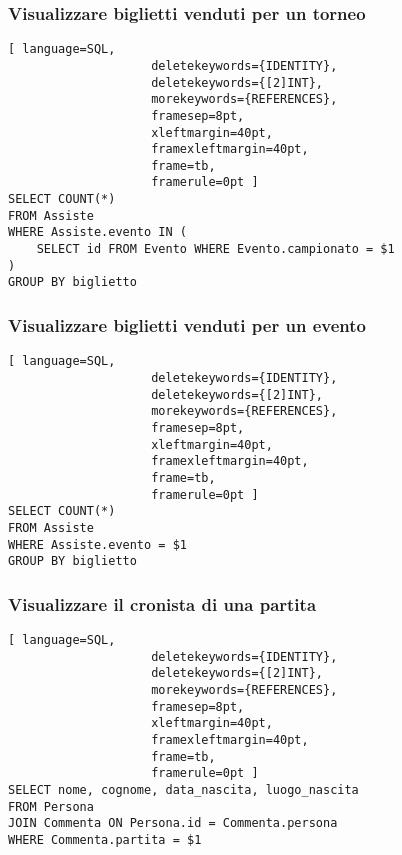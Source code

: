 \documentclass{article}
\begin{document}
\subsubsection{Visualizzare biglietti venduti per un torneo}
\begin{lstlisting}[ language=SQL,
                    deletekeywords={IDENTITY},
                    deletekeywords={[2]INT},
                    morekeywords={REFERENCES},
                    framesep=8pt,
                    xleftmargin=40pt,
                    framexleftmargin=40pt,
                    frame=tb,
                    framerule=0pt ]
SELECT COUNT(*)
FROM Assiste
WHERE Assiste.evento IN (
    SELECT id FROM Evento WHERE Evento.campionato = $1
)
GROUP BY biglietto
\end{lstlisting}

\subsubsection{Visualizzare biglietti venduti per un evento}
\begin{lstlisting}[ language=SQL,
                    deletekeywords={IDENTITY},
                    deletekeywords={[2]INT},
                    morekeywords={REFERENCES},
                    framesep=8pt,
                    xleftmargin=40pt,
                    framexleftmargin=40pt,
                    frame=tb,
                    framerule=0pt ]
SELECT COUNT(*)
FROM Assiste
WHERE Assiste.evento = $1
GROUP BY biglietto
\end{lstlisting}

\subsubsection{Visualizzare il cronista di una partita}
\begin{lstlisting}[ language=SQL,
                    deletekeywords={IDENTITY},
                    deletekeywords={[2]INT},
                    morekeywords={REFERENCES},
                    framesep=8pt,
                    xleftmargin=40pt,
                    framexleftmargin=40pt,
                    frame=tb,
                    framerule=0pt ]
SELECT nome, cognome, data_nascita, luogo_nascita
FROM Persona
JOIN Commenta ON Persona.id = Commenta.persona
WHERE Commenta.partita = $1
\end{lstlisting}
\end{document}
